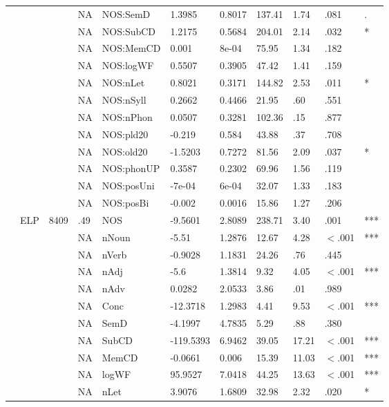\begin{table}[ht]
\begin{tabular}{lllllllllll}
   &  &  & NA & NOS:SemD & 1.3985 & 0.8017 & 137.41 & 1.74 & .081 & . \\ 
   &  &  & NA & NOS:SubCD & 1.2175 & 0.5684 & 204.01 & 2.14 & .032 & * \\ 
   &  &  & NA & NOS:MemCD & 0.001 & 8e-04 & 75.95 & 1.34 & .182 &   \\ 
   &  &  & NA & NOS:logWF & 0.5507 & 0.3905 & 47.42 & 1.41 & .159 &   \\ 
   &  &  & NA & NOS:nLet & 0.8021 & 0.3171 & 144.82 & 2.53 & .011 & * \\ 
   &  &  & NA & NOS:nSyll & 0.2662 & 0.4466 & 21.95 & .60 & .551 &   \\ 
   &  &  & NA & NOS:nPhon & 0.0507 & 0.3281 & 102.36 & .15 & .877 &   \\ 
   &  &  & NA & NOS:pld20 & -0.219 & 0.584 & 43.88 & .37 & .708 &   \\ 
   &  &  & NA & NOS:old20 & -1.5203 & 0.7272 & 81.56 & 2.09 & .037 & * \\ 
   &  &  & NA & NOS:phonUP & 0.3587 & 0.2302 & 69.96 & 1.56 & .119 &   \\ 
   &  &  & NA & NOS:posUni & -7e-04 & 6e-04 & 32.07 & 1.33 & .183 &   \\ 
   &  &  & NA & NOS:posBi & -0.002 & 0.0016 & 15.86 & 1.27 & .206 &   \\ 
   & ELP & 8409 & .49 & NOS & -9.5601 & 2.8089 & 238.71 & 3.40 & .001 & *** \\ 
   &  &  & NA & nNoun & -5.51 & 1.2876 & 12.67 & 4.28 & $<$.001 & *** \\ 
   &  &  & NA & nVerb & -0.9028 & 1.1831 & 24.26 & .76 & .445 &   \\ 
   &  &  & NA & nAdj & -5.6 & 1.3814 & 9.32 & 4.05 & $<$.001 & *** \\ 
   &  &  & NA & nAdv & 0.0282 & 2.0533 & 3.86 & .01 & .989 &   \\ 
   &  &  & NA & Conc & -12.3718 & 1.2983 & 4.41 & 9.53 & $<$.001 & *** \\ 
   &  &  & NA & SemD & -4.1997 & 4.7835 & 5.29 & .88 & .380 &   \\ 
   &  &  & NA & SubCD & -119.5393 & 6.9462 & 39.05 & 17.21 & $<$.001 & *** \\ 
   &  &  & NA & MemCD & -0.0661 & 0.006 & 15.39 & 11.03 & $<$.001 & *** \\ 
   &  &  & NA & logWF & 95.9527 & 7.0418 & 44.25 & 13.63 & $<$.001 & *** \\ 
   &  &  & NA & nLet & 3.9076 & 1.6809 & 32.98 & 2.32 & .020 & * \\ 

\end{tabular}
\end{table}

